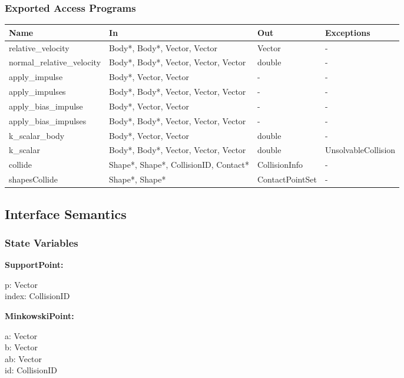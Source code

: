 \documentclass[12pt]{article}
\begin{document}
\subsubsection{Exported Access Programs} \label{SecEAPCollision}
	\renewcommand*{\arraystretch}{1.2}
	\begin{longtable}{| y | x{3.5cm} | y | x{3.5cm} |}
	\hline \textbf{Name} & \textbf{In} & \textbf{Out} & \textbf{Exceptions} \\ \hline 
	relative_velocity & Body*, Body*, Vector, Vector & Vector & - \\ \hline
	normal_relative_velocity & Body*, Body*, Vector, Vector, Vector & double & - \\ \hline
	apply_impulse & Body*, Vector, Vector & - & - \\ \hline
	apply_impulses & Body*, Body*, Vector, Vector, Vector & - & - \\ \hline
	apply_bias_impulse & Body*, Vector, Vector & - & - \\ \hline
	apply_bias_impulses & Body*, Body*, Vector, Vector, Vector & - & - \\ \hline
	k_scalar_body & Body*, Vector, Vector & double & - \\ \hline
	k_scalar & Body*, Body*, Vector, Vector, Vector & double & UnsolvableCollision \\ \hline
	collide & Shape*, Shape*, CollisionID, Contact* & CollisionInfo & - \\ \hline
	shapesCollide & Shape*, Shape* & ContactPointSet & - \\ \hline
\end{longtable}

\subsection{Interface Semantics}

\subsubsection{State Variables} \label{SecSVCollision}
\textbf{SupportPoint:} 
\begin{multicols}{2}
	\noindent p: Vector \\
	index: CollisionID
\end{multicols}
	
\noindent \textbf{MinkowskiPoint:} 
\begin{multicols}{2}
	\noindent a: Vector \\
	b: Vector \\
	ab: Vector \\
	id: CollisionID
\end{multicols}
\end{document}
